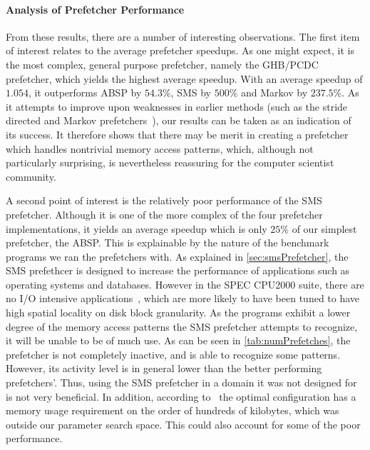 
\paragraph{Analysis of Prefetcher Performance}
\label{par:varprefperf}



From these results, there are a number of interesting
observations. The first item of interest relates to the average
prefetcher speedups. As one might expect, it is the most complex,
general purpose prefetcher, namely the GHB/PCDC prefetcher, which
yields the highest average speedup. With an average speedup of
$1.054$, it outperforms ABSP by $54.3\%$, SMS by $500\%$ and Markov by
$237.5\%$. As it attempts to improve upon weaknesses in earlier methods
(such as the stride directed and Markov prefetchers~\cite{Nesbit}),
our results can be taken as an indication of its success. It therefore
shows that there may be merit in creating a prefetcher which handles
nontrivial memory access patterns, which, although not particularly
surprising, is nevertheless reassuring for the computer scientist
community.%

A second point of interest is the relatively poor performance of the
SMS prefetcher. Although it is one of the more complex of the four
prefetcher implementations, it yields an average speedup which is only
$25\%$ of our simplest prefetcher, the ABSP. This is explainable by
the nature of the benchmark programs we ran the prefetchers with. As
explained in \autoref{sec:smsPrefetcher}, the SMS prefethcer is
designed to increase the performance of applications such as operating
systems and databases. However in the SPEC CPU2000 suite, there are no
I/O intensive applications~\cite{SPECFAQ}, which are more likely to
have been tuned to have high spatial locality on disk block
granularity. As the programs exhibit a lower degree of the memory
access patterns the SMS prefetcher attempts to recognize, it will be
unable to be of much use. As can be seen in
\autoref{tab:numPrefetches}, the prefetcher is not completely
inactive, and is able to recognize some patterns. However, its
activity level is in general lower than the better performing
prefetchers'. Thus, using the SMS prefetcher in a domain it was not
designed for is not very beneficial. In addition, according
to~\cite{SMS} the optimal configuration has a memory usage requirement
on the order of hundreds of kilobytes, which was outside our parameter
search space. This could also account for some of the poor
performance.

